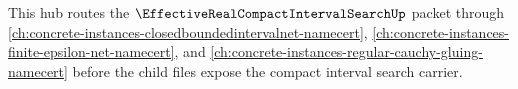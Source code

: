 This hub routes the $\EffectiveRealCompactIntervalSearchUp$ packet through \autoref{ch:concrete-instances-closedboundedintervalnet-namecert}, \autoref{ch:concrete-instances-finite-epsilon-net-namecert}, and \autoref{ch:concrete-instances-regular-cauchy-gluing-namecert} before the child files expose the compact interval search carrier.




